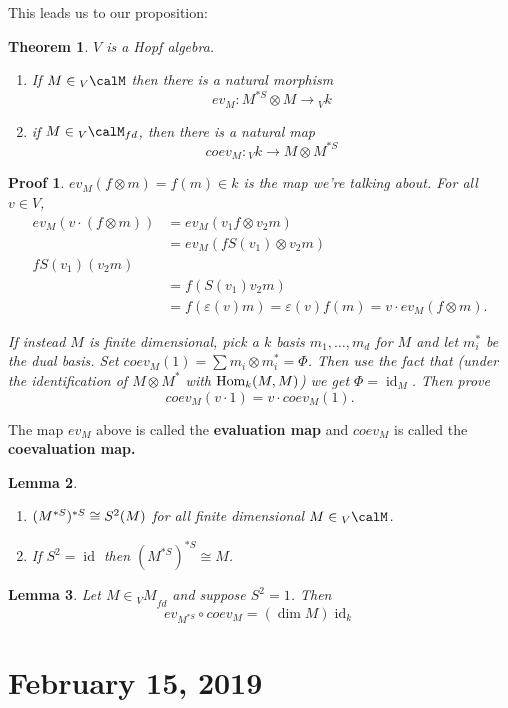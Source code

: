 \documentclass[12pt]{article}
\theoremstyle{break}
\theoremstyle{nonumberbreak}
\theoremstyle{changebreak}
\newtheorem{thm}{Theorem}[subsection]
\newtheorem{lem}[thm]{Lemma}
\theoremstyle{break}
\theoremstyle{nonumberbreak}
\newtheorem{prf}{Proof}
\theoremstyle{nonumberplain}
\theoremstyle{change}
\DeclareMathOperator{\id}{id}
\newcommand*{\Hom}{\ensuremath\text{Hom}}
\let\tilde\relax
\newcommand*{\tilde}[1]{\widetilde{#1}}
\begin{document}
This leads us to our proposition:
\begin{thm}
	$V$ is a Hopf algebra.
	\begin{enumerate}
		\item If $M\in{_V\calM}$ then there is a natural morphism
		\[ev_M:M^{*S}\otimes M\to {_Vk}\]
		\item if $M\in{_V\calM_{fd}}$, then there is a natural map
		\[coev_M:{_Vk}\to M\otimes M^{*S}\]
	\end{enumerate}
\end{thm}
\begin{prf}
	$ev_M(f\otimes m)=f(m)\in k$ is the map we're talking about. For all $v\in V$, 
	\begin{align*}
		ev_M(v\cdot(f\otimes m))&=ev_M(v_1f\otimes v_2 m)\\
		&=ev_M(fS(v_1)\otimes v_2m)\\
		fS(v_1)(v_2 m)\\
		&= f(S(v_1)v_2m)\\
		&= f(\varepsilon(v) m)=\varepsilon(v)f(m)=v\cdot ev_M(f\otimes m).
	\end{align*}

	If instead $M$ is finite dimensional, pick a $k$ basis $m_1,\dots,m_d$ for $M$ and let 
	$m_i^*$ be the dual basis. Set $coev_M(1)=\sum m_i\otimes m_i^*=\Phi$. Then use the fact that (under the identification of 
	$M\otimes M^*$ with $\Hom_k(M,M)$) we get $\Phi=\id_M$. Then prove 
	\[coev_M(v\cdot 1)=v\cdot coev_M(1).\]
\end{prf}
\begin{defn}
	The map $ev_M$ above is called the \textbf{evaluation map} and $coev_M$ is called the 
	\textbf{coevaluation map.}
\end{defn}

\begin{lem}
	\begin{enumerate}
		\item $(M^{*S})^{*S}\cong \tilde S^2(M)$ for all finite dimensional $M\in{_V\calM}$.
		\item If $S^2=\id$ then $(M^{*S})^{*S}\cong M$.
	\end{enumerate}
\end{lem}
\begin{lem}
	Let $M\in {_VM}_{fd}$ and suppose $S^2=1$. Then 
	\[ev_{M^{*S}}\circ coev_M=(\dim M)\id_k\]
\end{lem}

\section{February 15, 2019}
\end{document}
